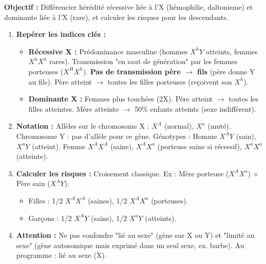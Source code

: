 \documentclass[11pt]{article}
\begin{document}
\begin{methode}
    \textbf{Objectif :} Différencier hérédité récessive liée à l'X (hémophilie, daltonisme) et dominante liée à l'X (rare), et calculer les risques pour les descendants.
    \begin{enumerate}
        \item \textbf{Repérer les indices clés :}
            \begin{itemize}
                \item \textbf{Récessive X :} Prédominance masculine (hommes $X^h Y$ atteints, femmes $X^h X^h$ rares). Transmission "en saut de génération" par les femmes porteuses ($X^H X^h$). \textbf{Pas de transmission père $\to$ fils} (père donne Y au fils). Père atteint $\to$ toutes les filles porteuses (reçoivent son $X^h$).
                \item \textbf{Dominante X :} Femmes plus touchées (2X). Père atteint $\to$ toutes les filles atteintes. Mère atteinte $\to$ 50\% enfants atteints (sexe indifférent).
            \end{itemize}
        \item \textbf{Notation :} Allèles sur le chromosome X : $X^A$ (normal), $X^a$ (muté). Chromosome Y : pas d'allèle pour ce gène. Génotypes : Homme $X^A Y$ (sain), $X^a Y$ (atteint). Femme $X^A X^A$ (saine), $X^A X^a$ (porteuse saine si récessif), $X^a X^a$ (atteinte).
        \item \textbf{Calculer les risques :} Croisement classique. Ex : Mère porteuse ($X^A X^a$) $\times$ Père sain ($X^A Y$).
            \begin{itemize}
                \item Filles : 1/2 $X^A X^A$ (saines), 1/2 $X^A X^a$ (porteuses).
                \item Garçons : 1/2 $X^A Y$ (sains), 1/2 $X^a Y$ (atteints).
            \end{itemize}
        \item \textbf{Attention :} Ne pas confondre "lié au sexe" (gène sur X ou Y) et "limité au sexe" (gène autosomique mais exprimé dans un seul sexe, ex. barbe). Au programme : lié au sexe (X).
    \end{enumerate}
\end{methode}
\end{document}
